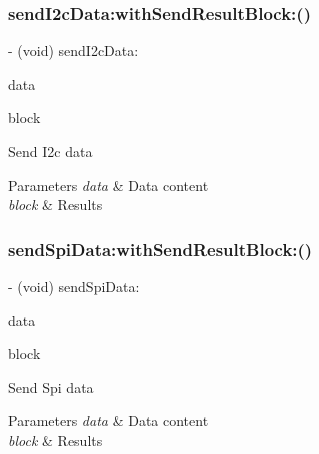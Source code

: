 \subsubsection{\texorpdfstring{send\+I2c\+Data\+:with\+Send\+Result\+Block\+:()}{sendI2cData:withSendResultBlock:()}}
{\footnotesize\ttfamily -\/ (void) send\+I2c\+Data\+: \begin{DoxyParamCaption}\item[{(\hyperlink{struct_p_v_s_d_k___m_o_u_n_t_a_p_i___i2_c___d_a_t_a}{P\+V\+S\+D\+K\+\_\+\+M\+O\+U\+N\+T\+A\+P\+I\+\_\+\+I2\+C\+\_\+\+D\+A\+TA})}]{data }\item[{withSendResultBlock:(P\+V\+Send\+Data\+Result\+Block)}]{block }\end{DoxyParamCaption}}

Send I2c data


\begin{DoxyParams}{Parameters}
{\em data} & Data content \\
\hline
{\em block} & Results \\
\hline
\end{DoxyParams}
\mbox{\label{interface_p_v_mount_a9157df82e088d45c7a453683dfdf0001}} 
\subsubsection{\texorpdfstring{send\+Spi\+Data\+:with\+Send\+Result\+Block\+:()}{sendSpiData:withSendResultBlock:()}}
{\footnotesize\ttfamily -\/ (void) send\+Spi\+Data\+: \begin{DoxyParamCaption}\item[{(\hyperlink{struct_p_v_s_d_k___m_o_u_n_t_a_p_i___s_p_i___d_a_t_a}{P\+V\+S\+D\+K\+\_\+\+M\+O\+U\+N\+T\+A\+P\+I\+\_\+\+S\+P\+I\+\_\+\+D\+A\+TA})}]{data }\item[{withSendResultBlock:(P\+V\+Send\+Data\+Result\+Block)}]{block }\end{DoxyParamCaption}}

Send Spi data


\begin{DoxyParams}{Parameters}
{\em data} & Data content \\
\hline
{\em block} & Results \\
\hline
\end{DoxyParams}
\mbox{\label{interface_p_v_mount_a926fa710d91412bedb7dbb32a68e42bf}} 
